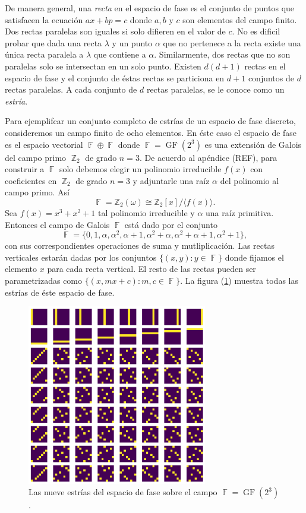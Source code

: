 \documentclass[a4paper]{report}
\DeclareMathOperator{\Z}{\mathbb{Z}}
\DeclareMathOperator{\F}{\mathbb{F}}
\DeclareMathOperator{\GF}{GF}
\begin{document}
  De manera general, una \textit{recta} en el espacio
  de fase es el conjunto de puntos que satisfacen la
  ecuación $ax + bp = c$ donde $a,b$ y $c$ son elementos del
  campo finito. Dos rectas paralelas son iguales si solo
  difieren en el valor de $c$.  No es dificil probar que
  dada una recta $\lambda$ y un punto $\alpha$ que no
  pertenece a la recta existe una única recta paralela a
  $\lambda$ que contiene a $\alpha$.  Similarmente, dos
  rectas que no son paralelas solo se intersectan en un solo
  punto. Existen $d(d+1)$ rectas en el espacio de fase y el
  conjunto de éstas rectas se particiona en $d+1$ conjuntos
  de $d$ rectas paralelas. A cada conjunto de $d$ rectas
  paralelas, se le conoce como un \textit{estría}. 

  Para ejemplifcar un conjunto completo de estrías de un
  espacio de fase discreto, consideremos un campo finito de
  ocho elementos. En éste caso el espacio de fase es el
  espacio vectorial $\F \oplus \F$ donde $\F =
  \GF\left(2^3\right)$ es una extensión de Galois del campo
  primo $\Z_2$ de grado $n = 3$. De acuerdo al apéndice
  (REF), para construir a $\F$ solo debemos elegir un
  polinomio irreducible $f(x)$ con coeficientes en $\Z_2$ de
  grado $n = 3$ y adjuntarle una raíz $\alpha$ del polinomio
  al campo primo. Así
  \[
    \F
    = \mathbb Z_2(\omega)
    \cong \mathbb Z_2[x] / \langle f(x) \rangle.
  \] 
  Sea $f(x) = x^3+x^2+1$ tal polinomio irreducible y
  $\alpha$ una raíz primitiva. Entonces el campo de Galois
  $\F$ está dado por el conjunto 
  \[
    \F = \{
      0, 1, \alpha, \alpha^2, \alpha+1, \alpha^2+\alpha,
      \alpha^2 + \alpha + 1, \alpha^2 + 1
    \},
  \] 
  con sus correspondientes operaciones de suma y
  mutliplicación. Las rectas verticales estarán dadas por
  los conjuntos $\{(x,y) : y \in \F\}$ donde fijamos el
  elemento $x$ para cada recta vertical. El resto de las
  rectas pueden ser parametrizadas como $\{(x,mx+c) : m, c
  \in \F\}$. La figura (\ref{fig:GF-2-3}) muestra todas las
  estrías de éste espacio de fase.

  \begin{figure}[ht]
    \centering
    \includegraphics[width=0.7\textwidth]{imgs/GF23.png}
    \caption{Las nueve estrías del espacio de fase sobre el
      campo $\F = \GF\left(2^3\right)$.}
    \label{fig:GF-2-3}
  \end{figure}
\end{document}
